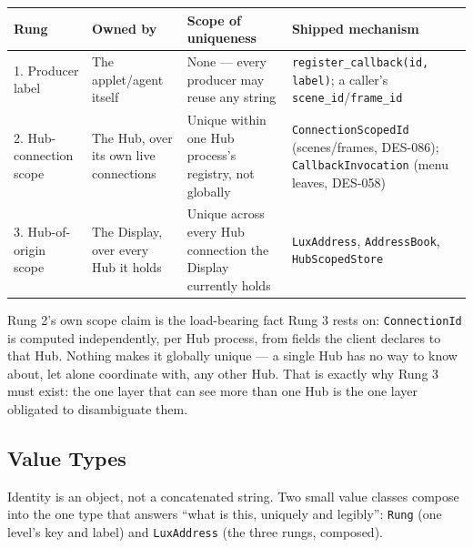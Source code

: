 \documentclass[a4paper,10pt]{article}
\newcommand{\field}[1]{\texttt{#1}}
\begin{document}
\begin{center}
\begin{tabular}{p{2.6cm}p{2.9cm}p{4.0cm}p{4.3cm}}
\toprule
\textbf{Rung} & \textbf{Owned by} & \textbf{Scope of uniqueness} & \textbf{Shipped mechanism} \\
\midrule
1. Producer label & The applet/agent itself & None --- every producer may
  reuse any string & \texttt{register\_callback(id, label)}; a caller's
  \field{scene\_id}/\field{frame\_id} \\
2. Hub-connection scope & The Hub, over its own live connections & Unique
  within one Hub process's registry, not globally & \texttt{ConnectionScopedId}
  (scenes/frames, DES-086); \texttt{CallbackInvocation} (menu leaves,
  DES-058) \\
3. Hub-of-origin scope & The Display, over every Hub it holds & Unique
  across every Hub connection the Display currently holds &
  \texttt{LuxAddress}, \texttt{AddressBook}, \texttt{HubScopedStore} \\
\bottomrule
\end{tabular}
\end{center}

Rung 2's own scope claim is the load-bearing fact Rung 3 rests on:
\texttt{ConnectionId} is computed independently, per Hub process, from
fields the client declares to that Hub.  Nothing makes it globally unique
--- a single Hub has no way to know about, let alone coordinate with, any
other Hub.  That is exactly why Rung 3 must exist: the one layer that can
see more than one Hub is the one layer obligated to disambiguate them.

\subsection{Value Types}\label{sec:addressing-types}

Identity is an object, not a concatenated string.  Two small value classes
compose into the one type that answers ``what is this, uniquely and
legibly'': \texttt{Rung} (one level's key and label) and \texttt{LuxAddress}
(the three rungs, composed).
\end{document}
